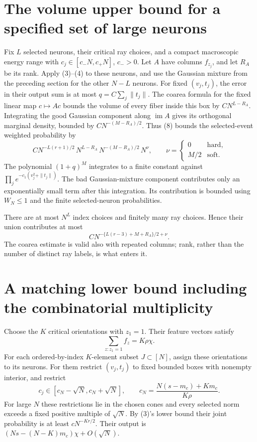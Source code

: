 \documentclass[11pt]{article}
\begin{document}
\section{The volume upper bound for a specified set of large neurons}
Fix $L$ selected neurons, their critical ray choices, and a compact
macroscopic energy range with $c_j\in[c_-N,c_+N]$, $c_->0$.
Let $A$ have columns $f_{z_j}$, and let $R_A$ be its rank.
Apply (3)--(4) to these neurons, and use the Gaussian mixture from the
preceding section for the other $N-L$ neurons.
For fixed $(v_j,t_j)$, the error in their output sum is at most
$q=C\sum_j\|t_j\|$. The coarea formula for the fixed linear map
$c\mapsto Ac$ bounds the volume of every fiber inside this box by
$C N^{L-R_A}$. Integrating the good Gaussian component along
$\operatorname{im}A$ gives its orthogonal marginal density, bounded
by $C N^{-(M-R_A)/2}$. Thus (8) bounds the selected-event weighted
probability by
\[
 C N^{-L(r+1)/2}\,N^{L-R_A}\,N^{-(M-R_A)/2}\,N^\nu,
 \qquad \nu=\begin{cases}0&\text{hard},\\ M/2&\text{soft}.
 \end{cases}                                             \tag{9}
\]
The polynomial $(1+q)^M$ integrates to a finite constant against
$\prod_j e^{-c_1(v_j^2+\|t_j\|)}$.
The bad Gaussian-mixture component contributes only an exponentially
small term after this integration. Its contribution is bounded using
$W_N\le1$ and the finite selected-neuron probabilities.

There are at most $N^L$ index choices and finitely many ray choices.
Hence their union contributes at most
\[
 C N^{-\{L(r-3)+M+R_A\}/2+\nu}.                         \tag{10}
\]
The coarea estimate is valid also with repeated columns; rank, rather
than the number of distinct ray labels, is what enters it.

\section{A matching lower bound including the combinatorial multiplicity}
Choose the $K$ critical orientations with $z_1=1$. Their feature vectors
satisfy
\[
 \sum_{z:z_1=1}f_z=K\rho\chi.
\]
For each ordered-by-index $K$-element subset $J\subset[N]$, assign
these orientations to its neurons. For them restrict $(v_j,t_j)$ to
fixed bounded boxes with nonempty interior, and restrict
\[
 c_j\in[c_N-\sqrt N,c_N+\sqrt N],\qquad
 c_N=\frac{N(s-m_c)+Km_c}{K\rho}.
\]
For large $N$ these restrictions lie in the chosen cones and every
selected norm exceeds a fixed positive multiple of $\sqrt N$.
By (3)'s lower bound their joint probability is at least
$cN^{-Kr/2}$. Their output is
$(Ns-(N-K)m_c)\chi+O(\sqrt N)$.
\end{document}

